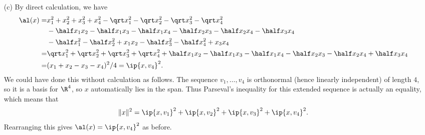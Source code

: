 \begin{solution}
\begin{itemize}
  \item[(c)] By direct calculation, we have 
   \begin{align*}
    \al(x) =& 
     x_1^2+x_2^2+x_3^2+x_4^2 - 
     \qrt x_1^2 - \qrt x_2^2 - \qrt x_3^2 - \qrt x_4^2 \\ &
     - \half x_1x_2 - \half x_1x_3 - \half x_1x_4
     - \half x_2x_3 - \half x_2x_4 - \half x_3x_4 \\ &
     - \half x_1^2 - \half x_2^2 + x_1x_2
     - \half x_3^2 - \half x_4^2 + x_3x_4 \\
     =& \qrt x_1^2 + \qrt x_2^2 + \qrt x_3^2 + \qrt x_4^2
     + \half x_1x_2 - \half x_1x_3 - \half x_1x_4
     - \half x_2x_3 - \half x_2x_4 + \half x_3x_4 \\
     =& (x_1+x_2-x_3-x_4)^2/4 = \ip{x,v_4}^2.
   \end{align*}
   We could have done this without calculation as follows.  The
   sequence $v_1,\dotsc,v_4$ is orthonormal (hence linearly
   independent) of length $4$, so it is a basis for $\R^4$, so $x$ automatically
   lies in the span.  Thus Parseval's inequality for this extended
   sequence is actually an equality, which means that 
   \[ \|x\|^2 =
        \ip{x,v_1}^2 + \ip{x,v_2}^2 + \ip{x,v_3}^2 + \ip{x,v_4}^2.
   \]
   Rearranging this gives $\al(x)=\ip{x,v_4}^2$ as before.
 \end{itemize}
\end{solution}






